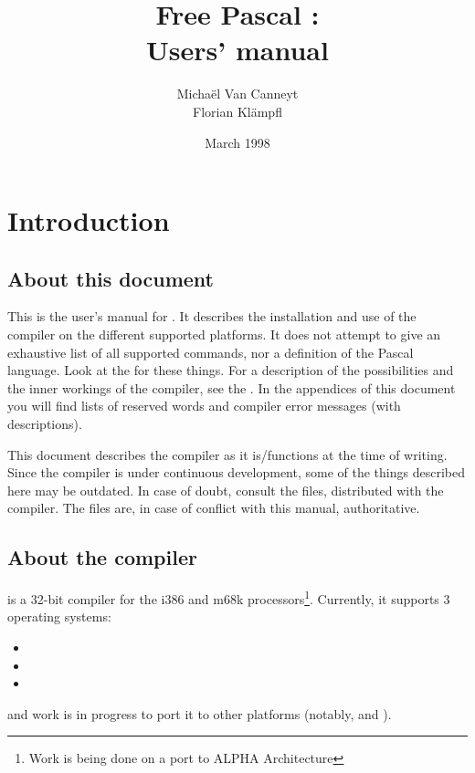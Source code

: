 \documentclass{report}
\begin{document}
\title{Free Pascal :\\ Users' manual}
\date{March 1998}
\author{Micha\"el Van Canneyt\\Florian Kl\"ampfl}
\maketitle
\tableofcontents
\chapter{Introduction}

\section{About this document}
This is the user's manual for \fpc . It describes the installation and use of
the \fpc compiler on the different supported platforms. 
It does not attempt to give an exhaustive list of all supported commands,
nor a definition of the Pascal language. Look at the
 for these things. 
For a description of the
possibilities and the inner workings of the compiler, see the
\progref. In the appendices of this document you will find lists of 
reserved words and compiler error messages (with descriptions).

This document describes the compiler as it is/functions at the time of 
writing. Since the compiler is under continuous development, some of the
things described here may be outdated. In case of doubt, consult the
 files, distributed with the compiler. 
The  files are, in case of conflict with this manual,
 authoritative.


\section{About the compiler}
\fpc is a 32-bit compiler for the i386 and m68k processors\footnote{Work is being done
on a port to ALPHA Architecture}. Currently, it supports 3 operating systems:
\begin{itemize}
\item \dos
\item \linux
\item \windowsnt
\end{itemize}
and work is in progress to port it to other platforms (notably, \ostwo and
).
\end{document}
